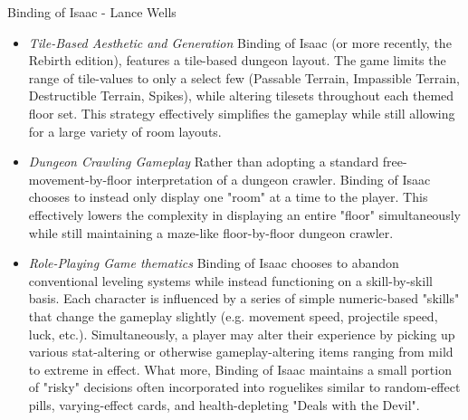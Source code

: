 \documentclass[12pt]{report}
\begin{document}
\begin{section}{Binding of Isaac - Lance Wells}
\begin{itemize}
\item 	\emph{Tile-Based Aesthetic and Generation}\newline
		Binding of Isaac (or more recently, the Rebirth edition), 
		features a tile-based dungeon layout. The game limits the 
		range of tile-values to only a select few (Passable Terrain, 
		Impassible Terrain, Destructible Terrain, Spikes), while altering 
		tilesets throughout each themed floor set. This strategy 
		effectively simplifies the gameplay while still allowing for a 
		large variety of room layouts.
\item	\emph{Dungeon Crawling Gameplay}\newline
		Rather than adopting a standard free-movement-by-floor interpretation
		of a dungeon crawler. Binding of Isaac chooses to instead only display
		one "room" at a time to the player. This effectively lowers the
		complexity in displaying an entire "floor" simultaneously while still
		maintaining a maze-like floor-by-floor dungeon crawler.
\item	\emph{Role-Playing Game thematics}\newline
		Binding of Isaac chooses to abandon conventional leveling systems
		while instead functioning on a skill-by-skill basis. Each character 
		is influenced by a series of simple numeric-based "skills" that change
		the gameplay slightly (e.g. movement speed, projectile speed, luck,
		etc.). Simultaneously, a player may alter their experience by picking
		up various stat-altering or otherwise gameplay-altering items ranging
		from mild to extreme in effect. What more, Binding of Isaac maintains a
		small portion of "risky" decisions often incorporated into roguelikes
		similar to random-effect pills, varying-effect cards, and health-depleting
		"Deals with the Devil".
\end{itemize}
\end{section}
\end{document}
